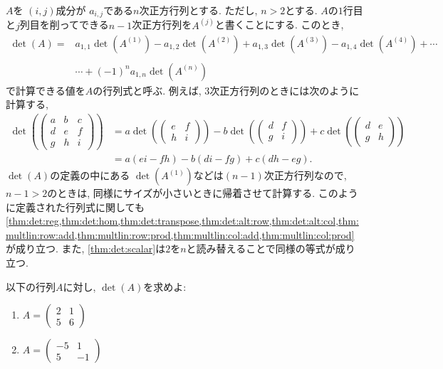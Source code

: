 \begin{remark}
  \label{def:det:generic}
  $A$を
  $(i,j)$成分が
  $a_{i,j}$である$n$次正方行列とする.
  ただし, $n>2$とする.
  $A$の$1$行目と$j$列目を削ってできる$n-1$次正方行列を$A^{(j)}$と書くことにする.
  このとき, 
  \begin{align*}
    \det(A)=&a_{1,1}\det(A^{(1)})-a_{1,2}\det(A^{(2)})+a_{1,3}\det(A^{(3)})-a_{1,4}\det(A^{(4)})+\cdots\\
    \\&\cdots +(-1)^n a_{1,n}\det(A^{(n)})
  \end{align*}
  で計算できる値を$A$の行列式と呼ぶ.
  例えば,
  $3$次正方行列のときには次のように計算する, 
  \begin{align*}
    \det(
    \begin{pmatrix}
      a&b&c\\
      d&e&f\\
      g&h&i      
    \end{pmatrix}
    )
    &=a
    \det(
    \begin{pmatrix}
      e&f\\
      h&i      
    \end{pmatrix}
    )-b
    \det(
    \begin{pmatrix}
      d&f\\
      g&i      
    \end{pmatrix}
    )
    +c
    \det(
    \begin{pmatrix}
      d&e\\
      g&h      
    \end{pmatrix}
    )\\
    &=a(ei-fh)
    -b(di-fg)
    +c(dh-eg).
  \end{align*}
  $\det(A)$の定義の中にある
  $\det(A^{(1)})$などは$(n-1)$次正方行列なので, $n-1>2$のときは,
  同様にサイズが小さいときに帰着させて計算する.
  このように定義された行列式に関しても\cref{thm:det:reg,thm:det:hom,thm:det:transpose,thm:det:alt:row,thm:det:alt:col,thm:multlin:row:add,thm:multlin:row:prod,thm:multlin:col:add,thm:multlin:col:prod}
  が成り立つ.
  また, \cref{thm:det:scalar}は$2$を$n$と読み替えることで同様の等式が成り立つ.
\end{remark}

\begin{quiz}
  \label{quiz:2:1}
  以下の行列$A$に対し, $\det(A)$を求めよ:
  \begin{enumerate}
  \item
    $A=\begin{pmatrix}2&1\\5&6\end{pmatrix}$
  \item
    $A=\begin{pmatrix}-5&1\\5&-1\end{pmatrix}$
  \end{enumerate}
\end{quiz}

